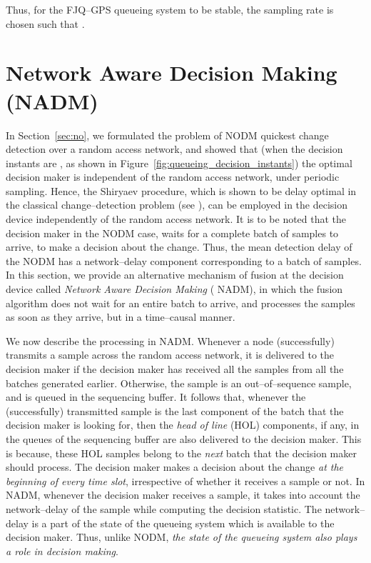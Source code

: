 \documentclass[acmtosn]{acmtrans2m}
\begin{document}
\vspace{1em}
\noindent
Thus, for the FJQ--GPS queueing system to be stable, 
the sampling rate  is chosen such that . 

\section{Network Aware Decision Making ({\sf NADM})}
\label{sec:na}
In Section~\ref{sec:no}, we formulated the problem of {\sf NODM}
quickest change detection over a random access network, and showed that
(when the decision instants are , as shown in
Figure~\ref{fig:queueing_decision_instants}) the optimal decision maker
is independent of the random access network, under periodic sampling.
Hence, the Shiryaev procedure, which is shown to be delay optimal in the
classical change--detection problem (see \cite{shiryayev}), can be
employed in the decision device independently of the random access
network. It is to be noted that the decision maker in the {\sf NODM}
case, waits for a complete batch of  samples to arrive, to make a
decision about the change. Thus, the mean detection delay of the {\sf
NODM} has a network--delay component corresponding to a batch of 
samples.  In this section, we provide an alternative mechanism of fusion
at the decision device called {\em Network Aware Decision Making} ({\sf
NADM}), in which the fusion algorithm does not wait for an entire batch
to arrive, and processes the samples as soon as they arrive, but in a
time--causal manner.  
 
We now describe the processing in {\sf NADM}. Whenever a node (successfully)
transmits a sample across the random access network, it is delivered to 
the decision maker if the decision maker has received all the samples 
from all the batches generated earlier. Otherwise, the sample is an 
out--of--sequence sample, and is queued in the sequencing buffer. It 
follows that, whenever the (successfully) transmitted sample is the 
last component of the batch that the decision maker is looking for, 
then the {\em head of line} (HOL) components, if any, in the queues 
of the sequencing buffer are also delivered to the decision maker. 
This is because, these HOL samples belong to the \emph{next} batch 
that the decision maker should process. The decision maker makes a 
decision about the change {\em at the beginning of every time slot}, 
irrespective of whether it receives a sample or not. In {\sf NADM}, 
whenever the decision maker receives a sample, it takes into account 
the network--delay of the sample while computing the decision statistic. 
The network--delay is a part of the state of the queueing system 
which is available to the decision maker. Thus, unlike NODM, {\em the state of the 
queueing system also plays a role in decision making}. 
\end{document}

